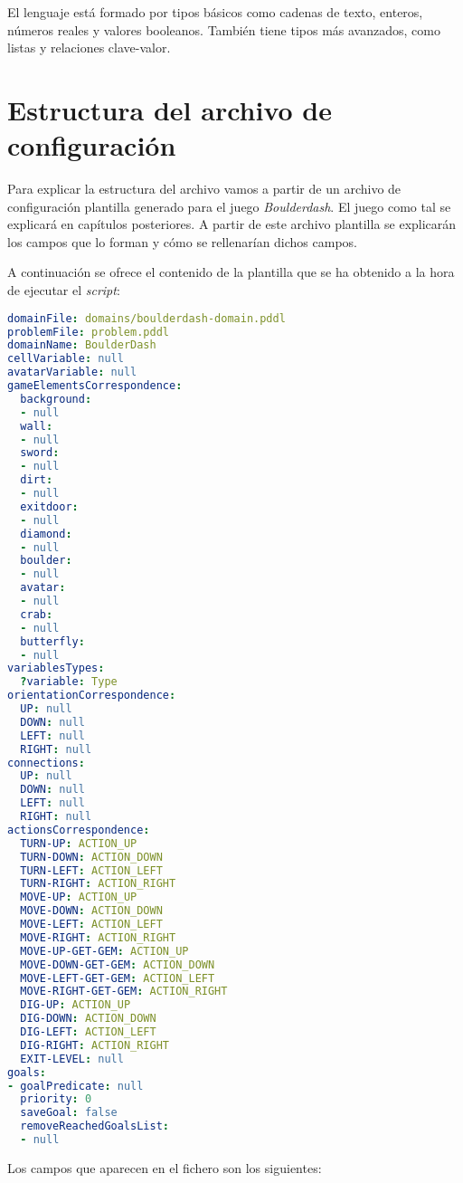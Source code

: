 El lenguaje está formado por tipos básicos como cadenas de texto, enteros, números reales y valores
booleanos. También tiene tipos más avanzados, como listas y relaciones clave-valor.

\section{Estructura del archivo de configuración}

Para explicar la estructura del archivo vamos a partir de un archivo de configuración plantilla
generado para el juego \textit{Boulderdash}. El juego como tal se explicará en capítulos posteriores.
A partir de este archivo plantilla se explicarán los campos que lo forman y cómo se rellenarían dichos
campos.

A continuación se ofrece el contenido de la plantilla que se ha obtenido a la hora de ejecutar
el \textit{script}:

\begin{lstlisting}[language=yaml]
domainFile: domains/boulderdash-domain.pddl
problemFile: problem.pddl
domainName: BoulderDash
cellVariable: null
avatarVariable: null
gameElementsCorrespondence:
  background:
  - null
  wall:
  - null
  sword:
  - null
  dirt:
  - null
  exitdoor:
  - null
  diamond:
  - null
  boulder:
  - null
  avatar:
  - null
  crab:
  - null
  butterfly:
  - null
variablesTypes:
  ?variable: Type
orientationCorrespondence:
  UP: null
  DOWN: null
  LEFT: null
  RIGHT: null
connections:
  UP: null
  DOWN: null
  LEFT: null
  RIGHT: null
actionsCorrespondence:
  TURN-UP: ACTION_UP
  TURN-DOWN: ACTION_DOWN
  TURN-LEFT: ACTION_LEFT
  TURN-RIGHT: ACTION_RIGHT
  MOVE-UP: ACTION_UP
  MOVE-DOWN: ACTION_DOWN
  MOVE-LEFT: ACTION_LEFT
  MOVE-RIGHT: ACTION_RIGHT
  MOVE-UP-GET-GEM: ACTION_UP
  MOVE-DOWN-GET-GEM: ACTION_DOWN
  MOVE-LEFT-GET-GEM: ACTION_LEFT
  MOVE-RIGHT-GET-GEM: ACTION_RIGHT
  DIG-UP: ACTION_UP
  DIG-DOWN: ACTION_DOWN
  DIG-LEFT: ACTION_LEFT
  DIG-RIGHT: ACTION_RIGHT
  EXIT-LEVEL: null
goals:
- goalPredicate: null
  priority: 0
  saveGoal: false
  removeReachedGoalsList:
  - null
\end{lstlisting}

Los campos que aparecen en el fichero son los siguientes:

